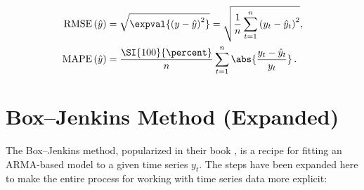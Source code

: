 \begin{subequations}\label{eq:time_series:RMSE_MAPE}
\begin{align}
\text{RMSE}\left(\hat{y}\right) &= \sqrt{\expval{\left(y - \hat{y}\right)^{2}}} = \sqrt{\frac{1}{n}\sum_{t=1}^{n} \left(y_{t} - \hat{y}_{t}\right)^{2}}, \label{eq:time_series:RMSE} \\
\text{MAPE}\left(\hat{y}\right) &= \frac{\SI{100}{\percent}}{n} \sum_{t=1}^{n} \abs{\frac{y_{t} - \hat{y}_{t}}{y_{t}}}\,. \label{eq:time_series:MAPE}
\end{align}
\end{subequations}

\section{Box--Jenkins Method (Expanded)}
\label{time_series:box_jenkins}

The Box--Jenkins method, popularized in their book \cite{boxjen76},
is a recipe for fitting an ARMA-based model to a given time series $y_{t}$.
The steps have been expanded here to make the entire process
for working with time series data more explicit:


